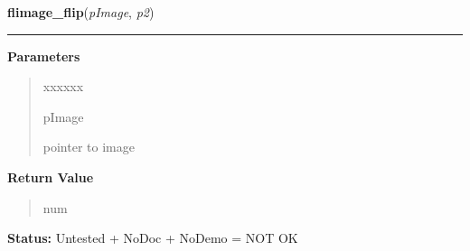 \hspace{.8\funcindent}\begin{boxedminipage}{\funcwidth}

    \raggedright \textbf{flimage\_flip}(\textit{pImage}, \textit{p2})

    \vspace{-1.5ex}

    \rule{\textwidth}{0.5\fboxrule}
\setlength{\parskip}{2ex}
\setlength{\parskip}{1ex}
      \textbf{Parameters}
      \vspace{-1ex}

      \begin{quote}
        \begin{Ventry}{xxxxxx}

          \item[pImage]

          pointer to image

        \end{Ventry}

      \end{quote}

      \textbf{Return Value}
    \vspace{-1ex}

      \begin{quote}
      num

      \end{quote}

\textbf{Status:} Untested + NoDoc + NoDemo = NOT OK



    \end{boxedminipage}

    \label{xformslib:library:flimage_scale}

    \vspace{0.5ex}

